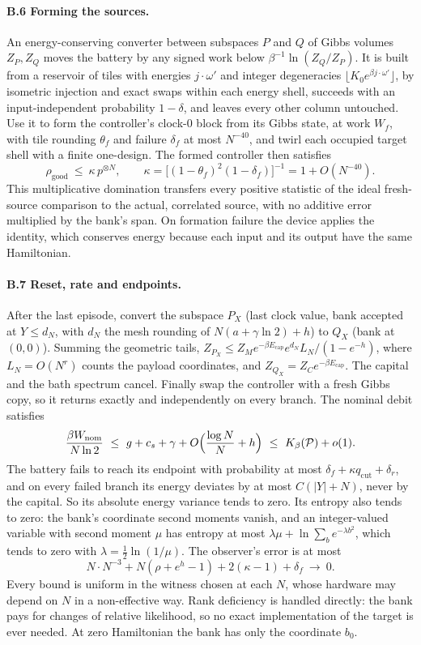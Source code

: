 \documentclass[11pt]{article}
\theoremstyle{definition}
\theoremstyle{remark}
\newcommand{\Kb}{K_\beta}
\newcommand{\Pp}{\mathcal P}
\begin{document}
\paragraph{B.6 Forming the sources.} An energy-conserving converter between subspaces $P$ and $Q$ of Gibbs volumes $Z_P,Z_Q$ moves the battery by any signed work below $\beta^{-1}\ln(Z_Q/Z_P)$. It is built from a reservoir of tiles with energies $j\cdot\omega'$ and integer degeneracies $\lfloor K_0e^{\beta j\cdot\omega'}\rfloor$, by isometric injection and exact swaps within each energy shell, succeeds with an input-independent probability $1-\delta$, and leaves every other column untouched. Use it to form the controller's clock-$0$ block from its Gibbs state, at work $W_f$, with tile rounding $\theta_f$ and failure $\delta_f$ at most $N^{-40}$, and twirl each occupied target shell with a finite one-design. The formed controller then satisfies
\[
\rho_{\mathrm{good}}\ \le\ \kappa\,p^{\otimes N},\qquad \kappa=\bigl[(1-\theta_f)^2(1-\delta_f)\bigr]^{-1}=1+O(N^{-40}).
\]
This multiplicative domination transfers every positive statistic of the ideal fresh-source comparison to the actual, correlated source, with no additive error multiplied by the bank's span. On formation failure the device applies the identity, which conserves energy because each input and its output have the same Hamiltonian.

\paragraph{B.7 Reset, rate and endpoints.} After the last episode, convert the subspace $P_X$ (last clock value, bank accepted at $Y\le d_N$, with $d_N$ the mesh rounding of $N(a+\gamma\ln2)+h$) to $Q_X$ (bank at $(0,0)$). Summing the geometric tails, $Z_{P_X}\le Z_Me^{-\beta E_{\mathrm{cap}}}e^{d_N}L_N/(1-e^{-h})$, where $L_N=O(N^r)$ counts the payload coordinates, and $Z_{Q_X}=Z_Ce^{-\beta E_{\mathrm{cap}}}$. The capital and the bath spectrum cancel. Finally swap the controller with a fresh Gibbs copy, so it returns exactly and independently on every branch. The nominal debit satisfies
\[
\frac{\beta W_{\mathrm{nom}}}{N\ln2}\ \le\ g+c_s+\gamma+O\Bigl(\frac{\log N}N+h\Bigr)\ \le\ \Kb(\Pp)+o(1).
\]
The battery fails to reach its endpoint with probability at most $\delta_f+\kappa q_{\mathrm{cut}}+\delta_r$, and on every failed branch its energy deviates by at most $C(|Y|+N)$, never by the capital. So its absolute energy variance tends to zero. Its entropy also tends to zero: the bank's coordinate second moments vanish, and an integer-valued variable with second moment $\mu$ has entropy at most $\lambda\mu+\ln\sum_be^{-\lambda b^2}$, which tends to zero with $\lambda=\frac12\ln(1/\mu)$. The observer's error is at most
\[
N\cdot N^{-3}+N(\rho+e^h-1)+2(\kappa-1)+\delta_f\ \to\ 0.
\]
Every bound is uniform in the witness chosen at each $N$, whose hardware may depend on $N$ in a non-effective way. Rank deficiency is handled directly: the bank pays for changes of relative likelihood, so no exact implementation of the target is ever needed. At zero Hamiltonian the bank has only the coordinate $b_0$.
\end{document}
